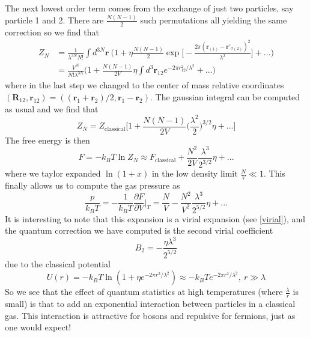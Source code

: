 \documentclass[a4paper,11pt,oneside]{book}
\begin{document}
The next lowest order term comes from the exchange of just two particles, say particle 1 and 2. There are $\frac{N(N-1)}{2}$ such permutations all yielding the same correction so we find that
\begin{align}
    Z_N &= \frac{1}{\lambda^{3N} N!} \int d^{3N}\textbf{r} \ \bigg(1+ \eta \frac{N(N-1)}{2} \exp \bigg[-\frac{2\pi(\textbf{r}_{(1)}-\textbf{r}'_{\sigma(2)})^2}{\lambda^2}\bigg]+...\bigg)\\
    &= \frac{V^N}{N! \lambda^{3N}}\bigg(1+\frac{N(N-1)}{2V}\eta \int d^3\textbf{r}_{12} e^{-2\pi r_{12}^2/\lambda^2}+...\bigg)
\end{align}
where in the last step we changed to the center of mass relative coordinates $(\textbf{R}_{12},\textbf{r}_{12}) = ((\textbf{r}_1+\textbf{r}_2)/2,\textbf{r}_1-\textbf{r}_2)$. The gaussian integral can be computed as usual and we find that
\begin{equation}
    Z_N = Z_{\text{classical}}\bigg[1+\frac{N(N-1)}{2V} \bigg(\frac{ \lambda^2}{2}\bigg)^{3/2}\eta+...\bigg]
\end{equation}
The free energy is then
\begin{equation}
    F=-k_B T \ln Z_N \approx F_{\text{classical}} + \frac{N^2}{2V}\frac{\lambda^3}{2^{3/2}} \eta+...
\end{equation}
where we taylor expanded $\ln(1+x)$ in the low density limit $\frac{N}{V}\ll1$. This finally allows us to compute the gas pressure as
\begin{equation}
    \frac{p}{k_BT} = -\frac{1}{k_BT}\frac{\partial F}{\partial V}\bigg|_T = \frac{N}{V}-\frac{N^2}{V^2}\frac{\lambda^3}{2^{5/2}} \eta+...
\end{equation}
It is interesting to note that this expansion is a virial expansion (see \eqref{virial}), and the quantum correction we have computed is the second virial coefficient
\begin{equation}
    B_2 = -\frac{\eta \lambda^3}{2^{5/2}}
\end{equation}
due to the classical potential
\begin{equation}
    U(r) =-k_B T\ln(1+\eta e^{-2\pi r^2/\lambda^2}) \approx -k_BTe^{-2\pi r^2/\lambda^2}, \ r \gg \lambda
\end{equation}
So we see that the effect of quantum statistics at high temperatures (where $\frac{\lambda}{r}$ is small) is that to add an exponential interaction between particles in a classical gas. This interaction is attractive for bosons and repulsive for fermions, just as one would expect!
\end{document}

